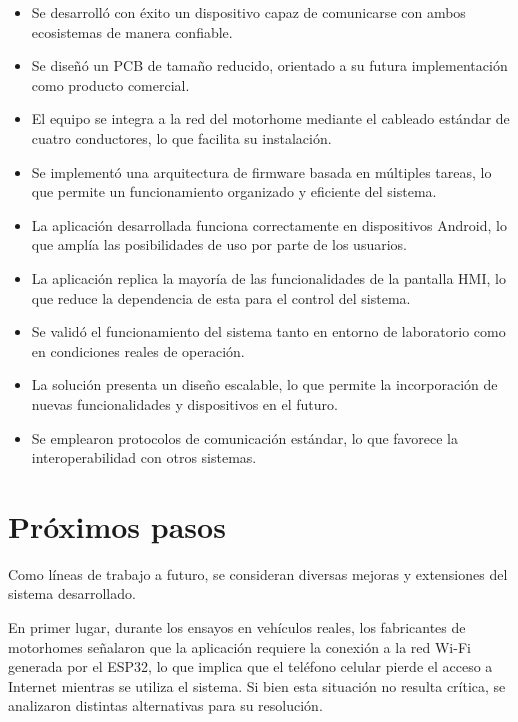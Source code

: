 \begin{itemize}
\item Se desarrolló con éxito un dispositivo capaz de comunicarse con ambos ecosistemas de manera confiable.
\item Se diseñó un PCB de tamaño reducido, orientado a su futura implementación como producto comercial.
\item El equipo se integra a la red del motorhome mediante el cableado estándar de cuatro conductores, lo que facilita su instalación.
\item Se implementó una arquitectura de firmware basada en múltiples tareas, lo que permite un funcionamiento organizado y eficiente del sistema.
\item La aplicación desarrollada funciona correctamente en dispositivos Android, lo que amplía las posibilidades de uso por parte de los usuarios.
\item La aplicación replica la mayoría de las funcionalidades de la pantalla HMI, lo que reduce la dependencia de esta para el control del sistema.
\item Se validó el funcionamiento del sistema tanto en entorno de laboratorio como en condiciones reales de operación.
\item La solución presenta un diseño escalable, lo que permite la incorporación de nuevas funcionalidades y dispositivos en el futuro.
\item Se emplearon protocolos de comunicación estándar, lo que favorece la interoperabilidad con otros sistemas.
\end{itemize}


\section{Próximos pasos}

Como líneas de trabajo a futuro, se consideran diversas mejoras y
extensiones del sistema desarrollado.

En primer lugar, durante los ensayos en vehículos reales, los
fabricantes de motorhomes señalaron que la aplicación requiere la
conexión a la red Wi-Fi generada por el ESP32, lo que implica que el
teléfono celular pierde el acceso a Internet mientras se utiliza el
sistema. Si bien esta situación no resulta crítica, se analizaron
distintas alternativas para su resolución.


